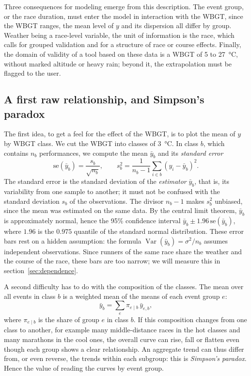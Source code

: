 \documentclass[11pt,a4paper]{article}
\DeclareMathOperator{\Var}{Var}
\begin{document}
Three consequences for modeling emerge from this description. The event group, or the race duration, must enter the
model in interaction with the WBGT, since the WBGT ranges, the mean level of $y$ and its dispersion all differ by
group. Weather being a race-level variable, the unit of information is the race, which calls for grouped validation
and for a structure of race or course effects. Finally, the domain of validity of a tool based on these data is a
WBGT of 5 to 27~°C, without marked altitude or heavy rain; beyond it, the extrapolation must be flagged to the user.

\subsection{A first raw relationship, and Simpson's paradox}\label{sec:simpson}

The first idea, to get a feel for the effect of the WBGT, is to plot the mean of $y$ by WBGT class. We cut the WBGT into
classes of 3~°C. In class $b$, which contains $n_b$ performances, we compute the mean $\bar y_b$ and its
\emph{standard error}
\[
\mathrm{se}(\bar y_b) = \frac{s_b}{\sqrt{n_b}}, \qquad s_b^2 = \frac{1}{n_b - 1}\sum_{i \in b}(y_i - \bar y_b)^2 .
\]
The standard error is the standard deviation of the \emph{estimator} $\bar y_b$, that is, its variability from one
sample to another; it must not be confused with the standard deviation $s_b$ of the observations. The divisor
$n_b - 1$ makes $s_b^2$ unbiased, since the mean was estimated on the same data. By the central limit theorem,
$\bar y_b$ is approximately normal, hence the 95\% confidence interval $\bar y_b \pm 1.96\,\mathrm{se}(\bar y_b)$,
where $1.96$ is the $0.975$ quantile of the standard normal distribution. These error bars rest on a hidden
assumption: the formula $\Var(\bar y_b) = \sigma^2/n_b$ assumes independent observations. Since runners of the same
race share the weather and the course of the race, these bars are too narrow; we will measure this in
section~\ref{sec:dependence}.

A second difficulty has to do with the composition of the classes. The mean over all events in class $b$ is a weighted
mean of the means of each event group $e$:
\[
\bar y_b = \sum_e \pi_{e \mid b}\,\bar y_{e, b},
\]
where $\pi_{e \mid b}$ is the share of group $e$ in class $b$. If this composition changes from one class to another,
for example many middle-distance races in the hot classes and many marathons in the cool ones, the overall curve can
rise, fall or flatten even though each group shows a clear relationship. An aggregate trend can thus differ from, or
even reverse, the trends within each subgroup: this is \emph{Simpson's paradox}. Hence the value of reading the
curves by event group.
\end{document}
